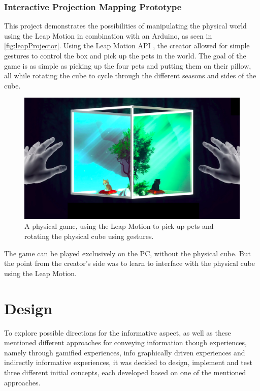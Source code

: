         	\subsubsection{Interactive Projection Mapping Prototype} %
    	    This project demonstrates the possibilities of manipulating the physical world using the Leap Motion in combination with an Arduino, as seen in \autoref{fig:leapProjector}. Using the Leap Motion API , the creator allowed for simple gestures to control the box and pick up the pets in the world. The goal of the game is as simple as picking up the four pets and putting them on their pillow, all while rotating the cube to cycle through the different seasons and sides of the cube\cite{leapMotionProjectionMapping}.
    	    \begin{figure}[H]
    	    	\centering
    	    	\includegraphics[width=0.8\linewidth]{figure/Analysis/LeapProjector.png}
    	    	\caption{A physical game, using the Leap Motion to pick up pets and rotating the physical cube using gestures\cite{leapMotionProjectionMapping}.}
    	    	\label{fig:leapProjector}
    	    \end{figure}
            The game can be played exclusively on the PC, without the physical cube. But the point from the creator's side was to learn to interface with the physical cube using the Leap Motion.


\section{Design}
To explore possible directions for the informative aspect, as well as these mentioned different approaches for conveying information though experiences, namely through gamified experiences, info graphically driven experiences and indirectly informative experiences, it was decided to design, implement and test three different initial concepts, each developed based on one of the mentioned approaches.

